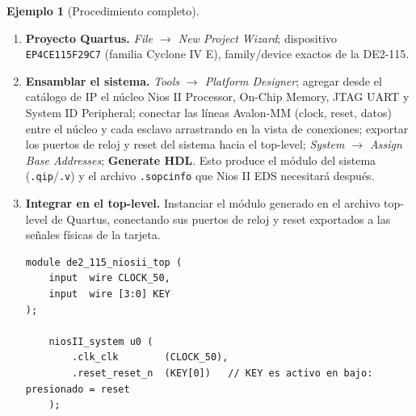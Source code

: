 \documentclass[11pt,letterpaper]{article}
\theoremstyle{definition}
\newtheorem{ejemplo}[definicion]{Ejemplo}
\begin{document}
\begin{ejemplo}[Procedimiento completo]
\begin{enumerate}[label=\textbf{(\arabic*)}, leftmargin=1.2cm]
  \item \textbf{Proyecto Quartus.} \emph{File $\to$ New Project Wizard}; dispositivo
        \texttt{EP4CE115F29C7} (familia Cyclone IV E), family/device exactos de la DE2-115.
  \item \textbf{Ensamblar el sistema.} \emph{Tools $\to$ Platform Designer}; agregar desde el
        catálogo de IP el núcleo Nios II Processor, On-Chip Memory, JTAG UART y System ID
        Peripheral; conectar las líneas Avalon-MM (clock, reset, datos) entre el núcleo y cada
        esclavo arrastrando en la vista de conexiones; exportar los puertos de reloj y reset del
        sistema hacia el top-level; \emph{System $\to$ Assign Base Addresses}; \textbf{Generate
        HDL}. Esto produce el módulo del sistema (\texttt{.qip}/\texttt{.v}) y el archivo
        \texttt{.sopcinfo} que Nios II EDS necesitará después.
  \item \textbf{Integrar en el top-level.} Instanciar el módulo generado en el archivo top-level de
        Quartus, conectando sus puertos de reloj y reset exportados a las señales físicas de la
        tarjeta.
\begin{lstlisting}[style=vstyle,caption={Instanciación del sistema generado en el top-level (Verilog)}]
module de2_115_niosii_top (
    input  wire CLOCK_50,
    input  wire [3:0] KEY
);

    niosII_system u0 (
        .clk_clk        (CLOCK_50),
        .reset_reset_n  (KEY[0])   // KEY es activo en bajo: presionado = reset
    );


\end{lstlisting}
\end{enumerate}
\end{ejemplo}
\end{document}
